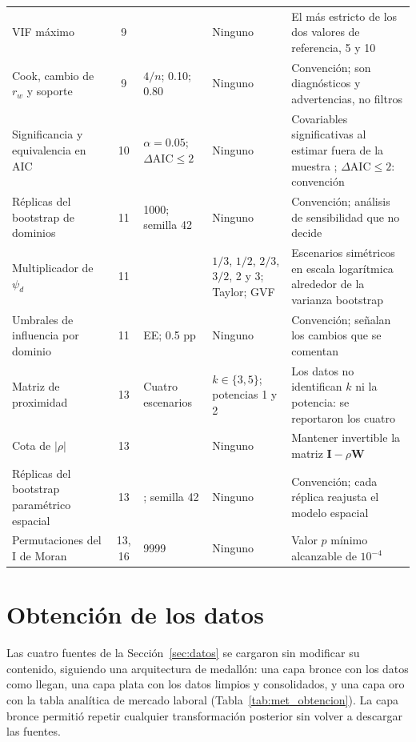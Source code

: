 {\begin{longtable}{>{\raggedright\arraybackslash}p{3.0cm} c >{\raggedright\arraybackslash}p{1.8cm} >{\raggedright\arraybackslash}p{2.2cm} >{\raggedright\arraybackslash}p{3.2cm}}
VIF máximo & 9 & 5 & Ninguno & El más estricto de los dos valores de referencia, 5 y 10 \cite[sec.~9.4]{MontgomeryPeckVining2012} \\
Cook, cambio de $r_w$ y soporte & 9 & $4/n$; 0.10; 0.80 & Ninguno & Convención; son diagnósticos y advertencias, no filtros \\
Significancia y equivalencia en AIC & 10 & $\alpha = 0.05$; $\Delta\text{AIC} \leq 2$ & Ninguno & Covariables significativas al estimar fuera de la muestra \cite[p.~453]{morales2021smallarea}; $\Delta\text{AIC} \leq 2$: convención \\
Réplicas del bootstrap de dominios & 11 & \num{1000}; semilla 42 & Ninguno & Convención; análisis de sensibilidad que no decide \\
Multiplicador de $\psi_d$ & 11 & 1 & $1/3$, $1/2$, $2/3$, $3/2$, 2 y 3; Taylor; GVF & Escenarios simétricos en escala logarítmica alrededor de la varianza bootstrap \\
Umbrales de influencia por dominio & 11 & 1 EE; 0.5 pp & Ninguno & Convención; señalan los cambios que se comentan \\
Matriz de proximidad & 13 & Cuatro escenarios & $k \in \{3, 5\}$; potencias 1 y 2 & Los datos no identifican $k$ ni la potencia: se reportaron los cuatro \\
Cota de $|\rho|$ & 13 & 0.99 & Ninguno & Mantener invertible la matriz $\mathbf{I} - \rho\mathbf{W}$ \\
Réplicas del bootstrap paramétrico espacial & 13 & 500; semilla 42 & Ninguno & Convención; cada réplica reajusta el modelo espacial \cite[pp.~490--494]{morales2021smallarea} \\
Permutaciones del I de Moran & 13, 16 & \num{9999} & Ninguno & Valor $p$ mínimo alcanzable de $10^{-4}$ \\
\end{longtable}
}

\section{Obtención de los datos}
\label{sec:met_obtencion}

Las cuatro fuentes de la Sección~\ref{sec:datos} se cargaron sin modificar su contenido, siguiendo una arquitectura de medallón: una capa bronce con los datos como llegan, una capa plata con los datos limpios y consolidados, y una capa oro con la tabla analítica de mercado laboral (Tabla~\ref{tab:met_obtencion}). La capa bronce permitió repetir cualquier transformación posterior sin volver a descargar las fuentes.

